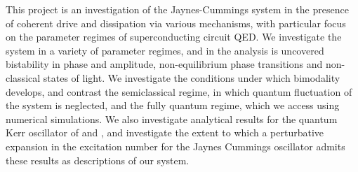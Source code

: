  This project is an investigation of the Jaynes-Cummings system in the presence of coherent drive and dissipation via various mechanisms, with particular focus on the parameter regimes of superconducting circuit QED.
We investigate the system in a variety of parameter regimes, and in the analysis is uncovered bistability in phase and amplitude, non-equilibrium phase transitions and non-classical states of light.
We investigate the conditions under which bimodality develops, and contrast the semiclassical regime, in which quantum fluctuation of the system is neglected, and the fully quantum regime, which we access using numerical simulations.
We also investigate analytical results for the quantum Kerr oscillator of \cite{Drummond1979} and \cite{Kheruntsyan1999}, and investigate the extent to which a perturbative expansion in the excitation number for the Jaynes Cummings oscillator admits these results as descriptions of our system. 
